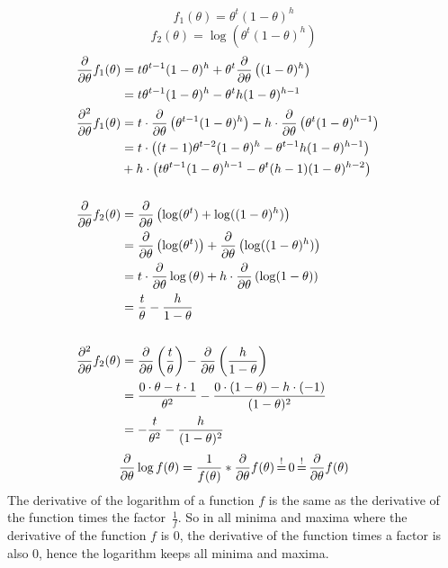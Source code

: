 %
%
\[ f_1(\theta) = \theta^t(1-\theta)^h \]
\[ f_2(\theta) = \log(\theta^t(1-\theta)^h) \]
\begin{align*}
\frac{\partial}{\partial \theta} f_1(\theta) &= t \theta^{t-1}(1-\theta)^h + \theta^t \frac{\partial}{\partial \theta}\left((1-\theta)^h\right) \\
&= t\theta^{t-1}(1-\theta)^h - \theta^t  h (1-\theta)^{h-1}
& \\
\frac{\partial^2}{\partial \theta} f_1(\theta) &= t \cdot \frac{\partial}{\partial \theta}\left(\theta^{t-1}(1-\theta)^h \right) - h \cdot \frac{\partial}{\partial \theta}\left(\theta^t (1-\theta)^{h-1}\right) \\
&= t \cdot \left((t-1)\theta^{t-2}(1-\theta)^h - \theta^{t-1}h(1-\theta)^{h-1}\right) \\
&+ h \cdot \left(t\theta^{t-1} (1-\theta)^{h-1} - \theta^t (h-1)(1-\theta)^{h-2}\right) \\
& \\
\frac{\partial}{\partial \theta} f_2(\theta) &= \frac{\partial}{\partial \theta}\left(\log(\theta^t) + \log((1-\theta)^h)\right) \\
&= \frac{\partial}{\partial \theta}\left(\log(\theta^t) \right) + \frac{\partial}{\partial \theta}\left(\log((1-\theta)^h)\right) \\
&= t \cdot \frac{\partial}{\partial \theta}\log\left(\theta\right) + h \cdot \frac{\partial}{\partial \theta}\left(\log(1-\theta)\right) \\
&= \frac{t}{\theta} - \frac{h}{1-\theta} \\
& \\
\frac{\partial^2}{\partial \theta} f_2(\theta) &= \frac{\partial}{\partial \theta}\left(\frac{t}{\theta}\right) - \frac{\partial}{\partial \theta}\left(\frac{h}{1-\theta}\right) \\
&= \frac{0\cdot \theta - t\cdot 1}{\theta^2} - \frac{0\cdot (1-\theta) - h \cdot (-1)}{(1-\theta)^2} \\
&= -\frac{t}{\theta^2} - \frac{h}{(1-\theta)^2}
\end{align*}
%
%
\newpage
%
%
\begin{equation*}
	\frac{\partial}{\partial \theta} \log f(\theta) = \frac{1}{f(\theta)} * \frac{\partial}{\partial \theta} f(\theta)  \operatorname*{\stackrel{!}{=}} 0 \operatorname*{\stackrel{!}{=}} \frac{\partial}{\partial \theta} f(\theta)  
\end{equation*}
The derivative of the logarithm of a function $f$ is the same as the derivative of the function times the factor~$\frac{1}{f}$. So in all minima and maxima where the derivative of the function $f$ is 0, the derivative of the function times a factor is also 0, hence the logarithm keeps all minima and maxima.

